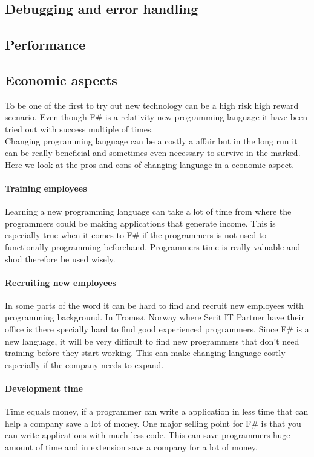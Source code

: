 \documentclass[12pt, a4paper]{article}
\begin{document}
\subsection{Debugging and error handling}
\subsection{Performance}

\newpage
\subsection{Economic aspects}

To be one of the first to try out new technology can be a high risk high reward scenario. Even though F\# is a relativity new programming language it have been tried out with success multiple of times.\\

Changing programming language can be a costly a affair but in the long run it can be really beneficial and sometimes even necessary to survive in the marked. Here we look at the pros and cons of changing language in a economic aspect.

\paragraph{Training employees}
Learning a new programming language can take a lot of time from where the programmers could be making applications that generate income. This is especially true when it comes to F\# if the programmers is not used to functionally programming beforehand. Programmers time is really valuable and shod therefore be used wisely. 

\paragraph{Recruiting new employees}
In some parts of the word it can be hard to find and recruit new employees with programming background. In Tromsø, Norway where Serit IT Partner have their office is there specially hard to find good experienced programmers. Since F\# is a new language, it will be very difficult to find new programmers that don't need training before they start working. This can make changing language costly especially if the company needs to expand.

\paragraph{Development time}
Time equals money, if a programmer can write a application in less time that can help a company save a lot of money. One major selling point for F\# is that you can write applications with much less code. This can save programmers huge amount of time and in extension save a company for a lot of money.
\end{document}
